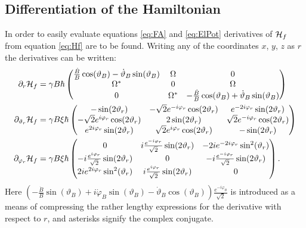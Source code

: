 \documentclass[a4paper]{article}
\begin{document}
\subsection{Differentiation of the Hamiltonian}\label{sec:Hdiff}
In order to easily evaluate equations \ref{eq:FA} and \ref{eq:ElPot} derivatives of
\(\mathbb{\cal H}_f\) from equation \ref{eq:Hf} are to be found. Writing any of the coordinates \(x\), \(y\), \(z\)
as \(r\) the derivatives can
be written:
\begin{align}
        \partial_r\mathbb{\cal H}_f  &= \gamma B \hbar{} \pmqty{
 \frac{\dot B}{B}\cos(\vartheta_B) -\dot \vartheta_B \sin(\vartheta_B) & \Omega & 0 \\
 \Omega^{*} & 0 & \Omega\\
 0 & \Omega^{*}& -\frac{\dot B}{B}\cos(\vartheta_B) + \dot \vartheta_B \sin(\vartheta_B)
        }\\
        \partial_{\vartheta_r} \mathbb{\cal H}_f &= \gamma B \xi \hbar{}\pmqty{
                -\sin(2\vartheta_r) & -\sqrt{2}  e^{-i\varphi_r}\cos(2\vartheta_r) &
                 e^{-2i\varphi_r}\sin(2\vartheta_r)\\
                -\sqrt{2}  e^{i\varphi_r}\cos(2\vartheta_r) & 2\sin(2\vartheta_r) &
                \sqrt{2} e^{-i\varphi_r}\cos(2\vartheta_r)\\
                 e^{2i\varphi_r}\sin(2\vartheta_r) & \sqrt{2} 
                e^{i\varphi_r}\cos(2\vartheta_r) & -\sin(2\vartheta_r)
        }\\
        \partial_{\varphi_r} \mathbb{\cal H}_f &= \gamma B \xi \hbar{}\pmqty{
                0 & i  \frac{e^{-i\varphi_r}}{\sqrt{2} }\sin(2\vartheta_r) &
                -2i e^{-2i\varphi_r}\sin[2](\vartheta_r)\\
                -i  \frac{e^{i\varphi_r}}{\sqrt{2} }\sin(2\vartheta_r) & 0 & -i 
                \frac{e^{-i\varphi_r}}{\sqrt{2} }\sin(2\vartheta_r) \\
                2i e^{2i\varphi_r}\sin[2](\vartheta_r) & i \frac{e^{i\varphi_r}}{\sqrt{2}
                }\sin(2\vartheta_r) & 0
        }
.\end{align}
Here \((-\frac{\dot B}{B}\sin(\vartheta_B) + i\dot \varphi_B 
 \sin(\vartheta_B) -\dot \vartheta_B \cos(\vartheta_B)) \frac{e^{-i\varphi_B}}{\sqrt{2}}\) is introduced as a means of compressing the
rather lengthy expressions for the derivative with respect to \(r\), and asterisks signify
the complex conjugate.
\end{document}
